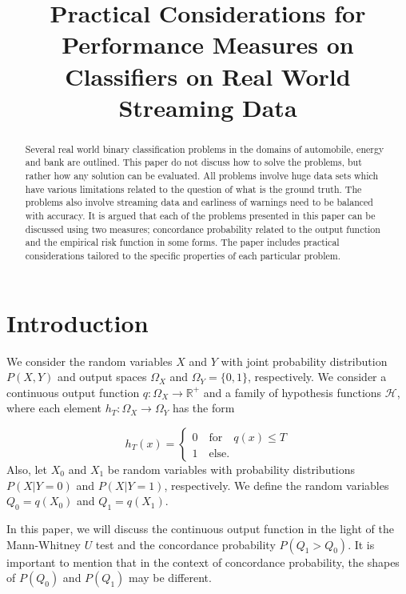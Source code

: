 \documentclass{article}
\title{Practical Considerations for Performance Measures on Classifiers on Real World Streaming Data}
\date{}
\theoremstyle{theorem}
\theoremstyle{definition}
\begin{document}
\maketitle

\begin{abstract}
Several real world binary classification problems in the domains of automobile, energy and bank are outlined.  This paper do not discuss how to solve the problems, but rather how any solution can be evaluated.  All problems involve huge data sets which have various limitations related to the question of what is the ground truth. The problems also involve streaming data and earliness of warnings need to be balanced with accuracy.  It is argued that each of the problems presented in this paper can be discussed using two measures; concordance probability related to the output function and the empirical risk function in some forms.  The paper includes practical considerations tailored to the specific properties of each particular problem.
\end{abstract}

\section{Introduction}

We consider the random variables $X$ and $Y$ with joint probability distribution $P(X,Y)$ and output spaces $\Omega_X$ and $\Omega_Y = \{0,1\}$, respectively.  We consider a continuous output function $q: \Omega_X \rightarrow \mathbb{R}^+$ and a family of hypothesis functions $\mathcal{H}$, where each element $h_T:\Omega_X \rightarrow \Omega_Y$ has the form 

\begin{equation}
\label{eq:ht}
h_T(x) = 
\begin{cases}
0 \quad \mbox{for} \quad q(x) \leq T\\
1 \quad \mbox{else}.
\end{cases}
\end{equation}
Also, let $X_0$ and $X_1$ be random variables with probability distributions $P(X | Y = 0)$ and $P(X | Y = 1)$, respectively.  We define the random variables $Q_0 = q(X_0)$ and $Q_1 = q(X_1)$.

In this paper, we will discuss the continuous output function in the light of the Mann-Whitney $U$ test and the concordance probability $P(Q_1 > Q_0)$.  It is important to mention that in the context of concordance probability, the shapes of $P(Q_0)$ and $P(Q_1)$ may be different. 
\end{document}
